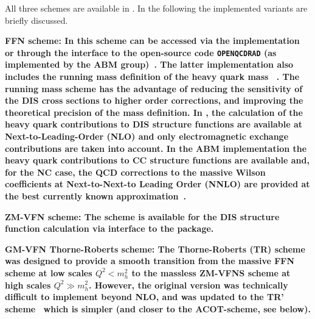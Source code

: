 All three schemes are available in \fitter . In the following
the implemented variants are briefly discussed.
% 
\begin{description}
\item \bf {FFN scheme:} \rm
In \fitter this scheme can be accessed via the 
\qcdnum implementation or through the interface to the open-source code \texttt{OPENQCDRAD} (as implemented by the ABM group)~\cite{openqcdrad:page}.
The latter implementation also includes the running mass definition of the heavy quark 
mass ~\cite{Alekhin:runm}.
The running mass scheme has the advantage of reducing the sensitivity of the DIS cross sections to
higher order corrections, and improving the theoretical precision of the mass definition. 
In \qcdnum, the calculation of the heavy quark contributions to DIS structure functions
are available at Next-to-Leading-Order (NLO) and only electromagnetic exchange contributions are taken into account.
In the ABM implementation the heavy quark contributions to CC structure functions are available 
and, for the NC case, the QCD corrections to the massive Wilson coefficients at Next-to-Next-to Leading Order (NNLO)
are provided at the best currently known approximation~\cite{SMoch:npb864}.
\item  
\bf {ZM-VFN scheme:} \rm 
The scheme is available for the DIS structure function calculation via interface to the \qcdnum package.
%
\item \bf {GM-VFN Thorne-Roberts scheme:} \rm
%
%
The Thorne-Roberts (TR) scheme~\cite{Thorne:1997ga} was designed to provide a smooth transition 
from the massive FFN scheme at low scales $Q^2 < m_h^2$ to the massless ZM-VFNS scheme at high scales $Q^2 \gg m_h^2$. 
However, the original version was technically difficult to implement beyond NLO, and was updated 
to the TR' scheme~\cite{Thorne:2006qt} which is simpler (and closer to the ACOT-scheme, see below).

\end{description}

